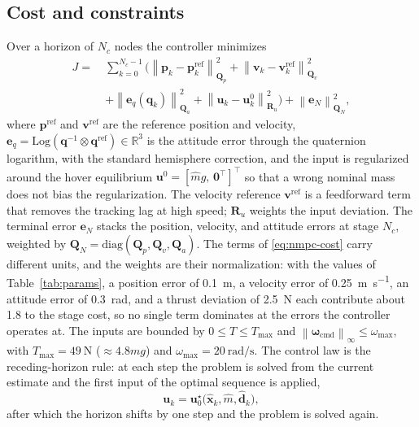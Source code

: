 \documentclass{ieeeaccess}
\newcommand{\R}{\mathbb{R}}
\newcommand{\norm}[1]{\left\| #1 \right\|}
\newcommand{\vect}[1]{\bm{#1}}
\newcommand{\mat}[1]{\mathbf{#1}}
\begin{document}
\subsection{Cost and constraints}
Over a horizon of $N_c$ nodes the controller minimizes
\begin{align}
J=\ &\sum_{k=0}^{N_c-1}\Big(
   \norm{\vect{p}_k-\vect{p}_k^{\text{ref}}}^2_{\mat{Q}_p}
  +\norm{\vect{v}_k-\vect{v}_k^{\text{ref}}}^2_{\mat{Q}_v}\nonumber\\
  &+\norm{\vect{e}_q(\vect{q}_k)}^2_{\mat{Q}_a}
  +\norm{\vect{u}_k-\vect{u}_k^0}^2_{\mat{R}_u}\Big)
  +\norm{\vect{e}_N}^2_{\mat{Q}_N},
\label{eq:nmpc-cost}
\end{align}
where $\vect{p}^{\text{ref}}$ and $\vect{v}^{\text{ref}}$ are the reference
position and velocity,
$\vect{e}_q=\mathrm{Log}(\vect{q}^{-1}\!\otimes\vect{q}^{\text{ref}})\in\R^3$ is
the attitude error through the quaternion logarithm, with the standard
hemisphere correction, and the input is regularized around the hover
equilibrium $\vect{u}^0=[\hat{m}g,\,\vect{0}^{\!\top}]^{\!\top}$ so that a wrong
nominal mass does not bias the regularization. The velocity reference
$\vect{v}^{\text{ref}}$ is a feedforward term that removes the tracking lag at
high speed; $\mat{R}_u$ weights the input deviation. The terminal error
$\vect{e}_N$ stacks the position, velocity, and attitude errors at stage $N_c$,
weighted by $\mat{Q}_N=\mathrm{diag}(\mat{Q}_p,\mat{Q}_v,\mat{Q}_a)$. The terms of \eqref{eq:nmpc-cost} carry different units, and the weights are their
normalization: with the values of Table~\ref{tab:params}, a position error of
\SI{0.1}{\meter}, a velocity error of \SI{0.25}{\meter\per\second}, an attitude
error of \SI{0.3}{\radian}, and a thrust deviation of \SI{2.5}{\newton} each
contribute about \num{1.8} to the stage cost, so no single term dominates at
the errors the controller operates at. The inputs
are bounded by
$0\leq T\leq T_{\max}$ and $\norm{\vect{\omega}_{\text{cmd}}}_\infty\leq\omega_{\max}$,
with $T_{\max}=\SI{49}{\newton}$ ($\approx4.8mg$) and
$\omega_{\max}=\SI{20}{\radian\per\second}$. The control law is the receding-horizon
rule: at each step the problem is solved from the current estimate and the
first input of the optimal sequence is applied,
\begin{equation}
\vect{u}_k=\vect{u}_0^{\star}\big(\hat{\vect{x}}_k,\hat{m},\hat{\vect{d}}_k\big),
\label{eq:rhc}
\end{equation}
after which the horizon shifts by one step and the problem is solved again.
\end{document}
